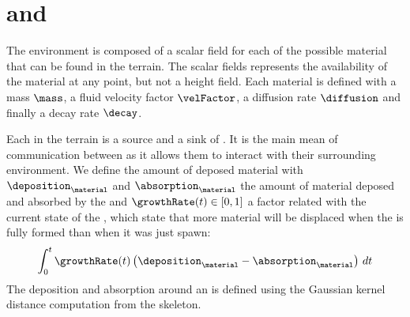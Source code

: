 



\section{ and }
\label{sec:semantic-representation_materials}
The environment is composed of a scalar field for each of the possible material that can be found in the terrain. The scalar fields represents the availability of the material at any point, but not a height field. Each material is defined with a mass $\mass$, a fluid velocity factor $\velFactor$, a diffusion rate $\diffusion$ and finally a decay rate $\decay$.

Each  in the terrain is a source and a sink of . It is the main mean of communication between  as it allows them to interact with their surrounding environment. We define the amount of deposed material with $\deposition_\material$ and $\absorption_\material$ the amount of material deposed and absorbed by the  and $\growthRate(t) \in [0, 1]$ a factor related with the current state of the , which state that more material will be displaced when the  is fully formed than when it was just spawn:
\begin{align*}
    \int_{0}^{t} {\growthRate(t) \left( \deposition_\material - \absorption_\material \right) \,dt}
\end{align*} 
The deposition and absorption around an  is defined using the Gaussian kernel distance computation from the skeleton.

